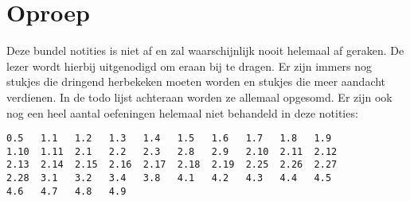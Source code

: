 \documentclass[main.tex]{subfiles}
\begin{document}
\chapter{Oproep}
\label{cha:oproep}

Deze bundel notities is niet af en zal waarschijnlijk nooit helemaal af geraken.
De lezer wordt hierbij uitgenodigd om eraan bij te dragen.
Er zijn immers nog {\Huge\hspace{5px}\hspace{5px}} stukjes die dringend herbekeken moeten worden en {\Huge\hspace{5px}\hspace{5px}} stukjes die meer aandacht verdienen.
In de todo lijst achteraan worden ze allemaal opgesomd.
\newline
Er zijn ook nog een heel aantal oefeningen helemaal niet behandeld in deze notities:\\

\noindent
\begin{verbatim}
0.5   1.1   1.2   1.3   1.4   1.5   1.6   1.7   1.8   1.9
1.10  1.11  2.1   2.2   2.3   2.8   2.9   2.10  2.11  2.12
2.13  2.14  2.15  2.16  2.17  2.18  2.19  2.25  2.26  2.27
2.28  3.1   3.2   3.4   3.8   4.1   4.2   4.3   4.4   4.5
4.6   4.7   4.8   4.9 
\end{verbatim}
\end{document}
